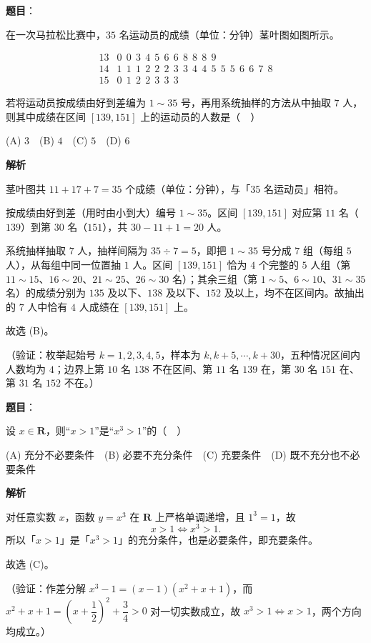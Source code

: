 \begin{answer}

\textbf{题目}：

在一次马拉松比赛中，\(35\) 名运动员的成绩（单位：分钟）茎叶图如图所示。

\nopagebreak[4]
\[
\begin{array}{c|l}
13 & 0\ \ 0\ \ 3\ \ 4\ \ 5\ \ 6\ \ 6\ \ 8\ \ 8\ \ 8\ \ 9 \\
14 & 1\ \ 1\ \ 1\ \ 2\ \ 2\ \ 2\ \ 3\ \ 3\ \ 4\ \ 4\ \ 5\ \ 5\ \ 5\ \ 6\ \ 6\ \ 7\ \ 8 \\
15 & 0\ \ 1\ \ 2\ \ 2\ \ 3\ \ 3\ \ 3
\end{array}
\]

若将运动员按成绩由好到差编为 \(1\sim35\) 号，再用系统抽样的方法从中抽取 \(7\) 人，则其中成绩在区间 \([139,151]\) 上的运动员的人数是（　）

(A) \(3\)　(B) \(4\)　(C) \(5\)　(D) \(6\)

\textbf{解析}

茎叶图共 \(11+17+7=35\) 个成绩（单位：分钟），与「35 名运动员」相符。

按成绩由好到差（用时由小到大）编号 \(1\sim35\)。区间 \([139,151]\) 对应第 \(11\) 名（\(139\)）到第 \(30\) 名（\(151\)），共 \(30-11+1=20\) 人。

系统抽样抽取 \(7\) 人，抽样间隔为 \(35\div7=5\)，即把 \(1\sim35\) 号分成 \(7\) 组（每组 \(5\) 人），从每组中同一位置抽 \(1\) 人。区间 \([139,151]\) 恰为 \(4\) 个完整的 \(5\) 人组（第 \(11\sim15\)、\(16\sim20\)、\(21\sim25\)、\(26\sim30\) 名）；其余三组（第 \(1\sim5\)、\(6\sim10\)、\(31\sim35\) 名）的成绩分别为 \(135\) 及以下、\(138\) 及以下、\(152\) 及以上，均不在区间内。故抽出的 \(7\) 人中恰有 \(4\) 人成绩在 \([139,151]\) 上。

故选 (B)。

（验证：枚举起始号 \(k=1,2,3,4,5\)，样本为 \(k,k+5,\cdots,k+30\)，五种情况区间内人数均为 \(4\)；边界上第 \(10\) 名 \(138\) 不在区间、第 \(11\) 名 \(139\) 在，第 \(30\) 名 \(151\) 在、第 \(31\) 名 \(152\) 不在。）


\end{answer}
\begin{answer}

\textbf{题目}：

设 \(x\in\mathbf{R}\)，则“\(x>1\)”是“\(x^3>1\)”的（　）

(A) 充分不必要条件　(B) 必要不充分条件　(C) 充要条件　(D) 既不充分也不必要条件

\textbf{解析}

对任意实数 \(x\)，函数 \(y=x^3\) 在 \(\mathbf{R}\) 上严格单调递增，且 \(1^3=1\)，故
\nopagebreak[4]
\[
x>1\iff x^3>1.
\]
所以「\(x>1\)」是「\(x^3>1\)」的充分条件，也是必要条件，即充要条件。

故选 (C)。

（验证：作差分解 \(x^3-1=(x-1)(x^2+x+1)\)，而 \(x^2+x+1=\left(x+\dfrac12\right)^2+\dfrac34>0\) 对一切实数成立，故 \(x^3>1\iff x>1\)，两个方向均成立。）


\end{answer}
